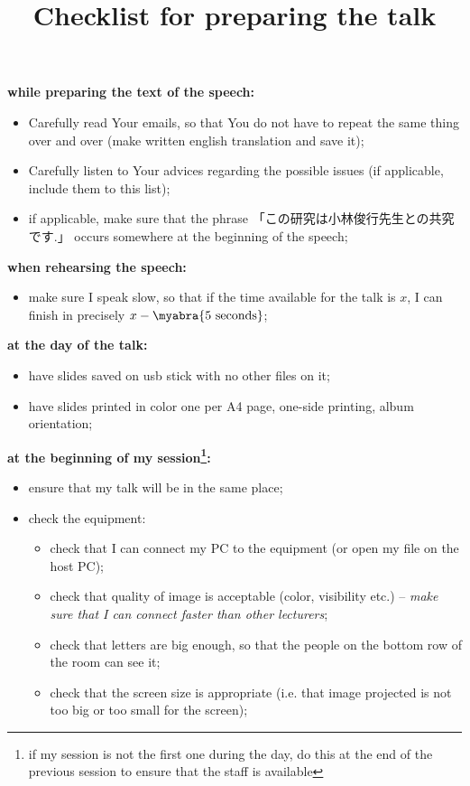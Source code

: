 \documentclass[12pt]{article} %
\title{Checklist for preparing the talk}
\newcommand{\kana}[2]{\ruby{#1}{#2}}
\begin{document}
	\maketitle

	\textbf{while preparing the text of the speech:}
	\begin{itemize}
		\item Carefully read Your emails, so that You do not have to repeat the same thing over and over (make written english translation
			and save it);
		\item Carefully listen to Your advices regarding the possible issues (if applicable, include them to this list);
		\item if applicable, make sure that the phrase 「この研究は小林俊行先生との共\kana{同研}{キョウドウ}究です.」 occurs somewhere at the beginning of the speech;
	\end{itemize}
	\textbf{when rehearsing the speech:}
	\begin{itemize}
		\item make sure I speak slow, so that if the time available for the talk is $x$, I can finish in precisely $x-\myabra{\mbox{5 seconds}}$;
	\end{itemize}
	\textbf{at the day of the talk:}
	\begin{itemize}
		\item have slides saved on usb stick with no other files on it;
		\item have slides printed in color one per A4 page, one-side printing, album orientation;
	\end{itemize}
	\textbf{at the beginning of my session\footnote{\normalfont if my session is not the first one during the day, do this at the end of the previous session to ensure that
	the staff is available}:}
	\begin{itemize}
		\item ensure that my talk will be in the same place;
		\item check the equipment:\begin{itemize}
				\item check that I can connect my PC to the equipment (or open my file on the host PC);
				\item check that quality of image is acceptable (color, visibility etc.) -- \textit{make sure that I can connect faster than other lecturers};
				\item check that letters are big enough, so that the people on the bottom row of the room can see it;
				\item check that the screen size is appropriate (i.e. that image projected is not too big or too small for the screen);
			\end{itemize}
	\end{itemize}
\end{document}
